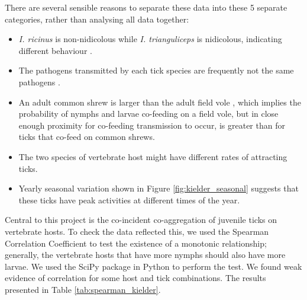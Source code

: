 \documentclass{article}
\begin{document}
There are several sensible reasons to separate these data into these 5 separate categories, rather than analysing all data together:

\begin{itemize}
    \item \textit{I. ricinus} is non-nidicolous while \textit{I. trianguliceps} is nidicolous, indicating different behaviour \cite{}.
    \item The pathogens transmitted by each tick species are frequently not the same pathogens \cite{}.
    \item An adult common shrew is larger than the adult field vole \cite{}, which implies the probability of nymphs and larvae co-feeding on a field vole, but in close enough proximity for co-feeding transmission to occur, is greater than for ticks that co-feed on common shrews. 
    \item The two species of vertebrate host might have different rates of attracting ticks.
    \item Yearly seasonal variation shown in Figure \ref{fig:kielder_seasonal} suggests that these ticks have peak activities at different times of the year.
\end{itemize}

Central to this project is the co-incident co-aggregation of juvenile ticks on vertebrate hosts. To check the data reflected this, we used the Spearman Correlation Coefficient to test the existence of a monotonic relationship; generally, the vertebrate hosts that have more nymphs should also have more larvae. 
We used the SciPy package in Python to perform the test. We found weak evidence of correlation for some host and tick combinations. The results presented in Table \ref{tab:spearman_kielder}.
\end{document}
